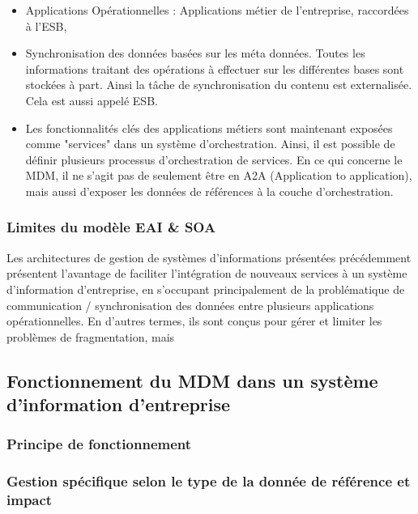 \begin{itemize}

\item Applications Opérationnelles : Applications métier de l'entreprise, raccordées à l'ESB, 

\item Synchronisation des données basées sur les méta données. Toutes les informations traitant  des opérations à effectuer sur les différentes bases sont stockées à part. Ainsi la tâche de synchronisation du contenu est externalisée. Cela est aussi appelé ESB.

\item Les fonctionnalités clés des applications métiers sont maintenant exposées  comme "services" dans un système d'orchestration. Ainsi, il est possible de définir plusieurs processus d'orchestration de services. En ce qui concerne le MDM, il ne s'agit pas de seulement être en A2A (Application to application), mais aussi d'exposer les données de références à la couche d'orchestration.

\end{itemize}

\subsubsection{Limites du modèle EAI \& SOA}

Les architectures de gestion de systèmes d'informations présentées précédemment présentent l'avantage de faciliter l'intégration de nouveaux services à un système d'information d'entreprise, en s'occupant principalement de la problématique de communication / synchronisation des données entre plusieurs applications opérationnelles. En d'autres termes, ils sont conçus pour gérer et limiter les problèmes de fragmentation, mais 

\subsection{Fonctionnement du MDM dans un système d'information d'entreprise}

\subsubsection{Principe de fonctionnement}

\subsubsection{Gestion spécifique selon le type de la donnée de référence et impact}

